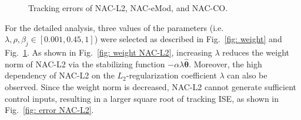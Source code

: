 \documentclass[letterpaper, 10 pt, conference]{ieeeconf}  %
\newcommand\ie{\textrm{i.e.\ }}
\newcommand*{\mv}[1]{\boldsymbol{#1}}
\begin{document}
\begin{figure}[!t]      
    \centering
    \vfill
    \vfill
    \vfill
    \caption{Tracking errors of NAC-L2, NAC-eMod, and NAC-CO.}
    \label{fig: error}
\end{figure}

For the detailed analysis, three values of the parameters (\ie $\lambda,\rho,\beta_j\in[0.001,0.45,1]$) were selected as described in Fig.~\ref{fig: weight} and Fig.~\ref{fig: error}.
As shown in Fig.~\ref{fig: weight NAC-L2}, increasing $\lambda$ reduces the weight norm of NAC-L2 via the stabilizing function $-\alpha\lambda{\hat{\mv\theta}}$.
Moreover, the high dependency of NAC-L2 on the $L_2$-regularization coefficient $\lambda$ can also be observed.
Since the weight norm is decreased, NAC-L2 cannot generate sufficient control inputs, resulting in a larger square root of tracking ISE, as shown in Fig.~\ref{fig: error NAC-L2}.
\end{document}
